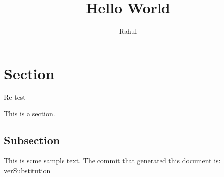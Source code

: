 \documentclass[12pt]{article}
\title{Hello World}
\author{Rahul}
\begin{document}
\maketitle

\section{Section}

Re test

This is a section. 

\subsection{Subsection}

This is some sample text.
The commit that generated this document is: verSubstitution
\end{document}
